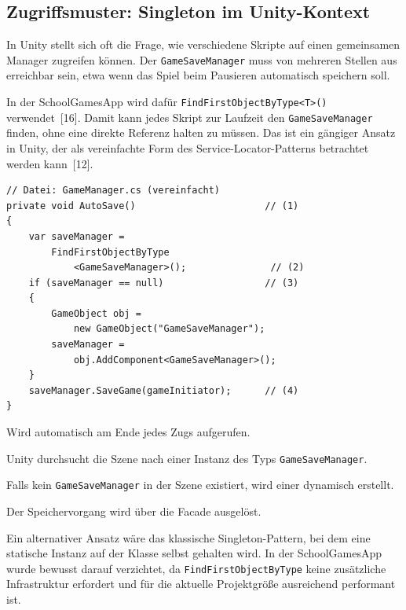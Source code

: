 \documentclass[12pt,a4paper]{article}
\begin{document}
\subsection{Zugriffsmuster: Singleton im Unity-Kontext}

In Unity stellt sich oft die Frage, wie verschiedene Skripte auf einen gemeinsamen Manager zugreifen können. Der \texttt{GameSaveManager} muss von mehreren Stellen aus erreichbar sein, etwa wenn das Spiel beim Pausieren automatisch speichern soll.

In der SchoolGamesApp wird dafür \texttt{FindFirstObjectByType<T>()} verwendet~[16]. Damit kann jedes Skript zur Laufzeit den \texttt{GameSaveManager} finden, ohne eine direkte Referenz halten zu müssen. Das ist ein gängiger Ansatz in Unity, der als vereinfachte Form des Service-Locator-Patterns betrachtet werden kann~[12].

\begin{lstlisting}
// Datei: GameManager.cs (vereinfacht)
private void AutoSave()                       // (1)
{
    var saveManager =
        FindFirstObjectByType
            <GameSaveManager>();               // (2)
    if (saveManager == null)                  // (3)
    {
        GameObject obj =
            new GameObject("GameSaveManager");
        saveManager =
            obj.AddComponent<GameSaveManager>();
    }
    saveManager.SaveGame(gameInitiator);      // (4)
}
\end{lstlisting}

\begin{description}[leftmargin=2em, labelwidth=1.5em]
    \item[(1)] Wird automatisch am Ende jedes Zugs aufgerufen.
    \item[(2)] Unity durchsucht die Szene nach einer Instanz des Typs \texttt{GameSaveManager}.
    \item[(3)] Falls kein \texttt{GameSaveManager} in der Szene existiert, wird einer dynamisch erstellt.
    \item[(4)] Der Speichervorgang wird über die Facade ausgelöst.
\end{description}

Ein alternativer Ansatz wäre das klassische Singleton-Pattern, bei dem eine statische Instanz auf der Klasse selbst gehalten wird. In der SchoolGamesApp wurde bewusst darauf verzichtet, da \texttt{FindFirstObjectByType} keine zusätzliche Infrastruktur erfordert und für die aktuelle Projektgröße ausreichend performant ist.
\end{document}
